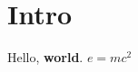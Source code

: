 \documentclass{article}
\begin{document}
\section{Intro}
Hello, \textbf{world}. $e = mc^2$
\end{document}

